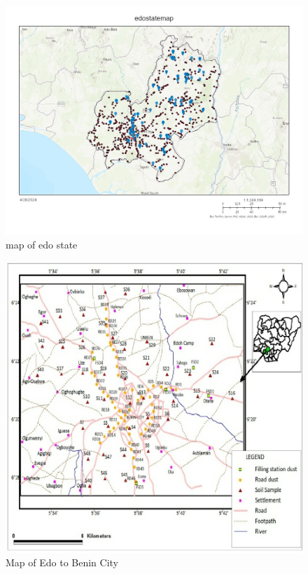 \begin{figure}[h!]
    \centering
    \includegraphics[width=1\linewidth]{edostate_updated.jpg}
    \caption{map of edo state}
    \label{fig:edostatemap}
\end{figure}
\vspace{1cm} 
\begin{figure}[h!]
    \centering
    \includegraphics[width=1\linewidth]{edobenin.png}
    \caption{Map of Edo to Benin City }
    \label{fig:edobeninstatemap}
\end{figure}


